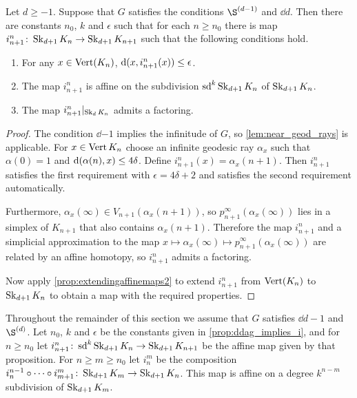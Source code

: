 \documentclass[a4paper]{article}
\begin{document}
\begin{proposition}\label{prop:ddag_implies_i}
  Let $d \geq -1$. Suppose that $G$ satisfies the conditions $\Sd{d-1}$ and
  $\dd{d}$. Then there are constants $n_0$, $k$ and $\epsilon$ such that for
  each $n\geq n_0$ there is map $i^n_{n+1}\colon\operatorname{Sk}_{d+1} K_n \to \operatorname{Sk}_{d+1}
  K_{n+1}$ such that the following conditions hold.
  \begin{enumerate}
    \item For any $x \in \operatorname{Vert}(K_n)$, $\operatorname{d}(x, i_{n+1}^n(x)) \leq
      \epsilon$.
    \item The map $i^n_{n+1}$ is affine on the subdivision $\operatorname{sd}^k\operatorname{Sk}_{d+1}
      K_n$ of $\operatorname{Sk}_{d+1}K_n$.
    \item The map $i^n_{n+1}\vert_{\operatorname{Sk}_d K_n}$ admits a factoring.
  \end{enumerate}
\end{proposition}

\begin{proof}
  The condition $\dd{-1}$ implies the infinitude of $G$, so
  \cref{lem:near_geod_rays} is applicable. For $x \in \operatorname{Vert}{K_n}$ choose an
  infinite geodesic ray $\alpha_x$ such that $\alpha(0) = 1$ and
  $\operatorname{d}(\alpha(n), x) \leq 4\delta$. Define $i^n_{n+1}(x) =
  \alpha_x(n+1)$. Then $i^n_{n+1}$ satisfies the first requirement with
  $\epsilon = 4\delta+2$ and satisfies the second requirement automatically.

  Furthermore, $\alpha_x(\infty) \in V_{n+1}(\alpha_x(n+1))$, so 
  $p^\infty_{n+1}(\alpha_x(\infty))$ lies in a simplex of $K_{n+1}$ that also 
  contains $\alpha_x(n+1)$.  Therefore the map $i^n_{n+1}$ and a simplicial 
  approximation to the map $x \mapsto \alpha_x(\infty) \mapsto p^\infty_{n+1} 
  (\alpha_x(\infty))$ are related by an affine homotopy, so $i^n_{n+1}$ admits a 
  factoring. 

  Now apply \cref{prop:extendingaffinemaps2} to extend $i^n_{n+1}$ from
  $\operatorname{Vert}(K_n)$ to $\operatorname{Sk}_{d+1} K_n$ to obtain a map with the required
  properties.
\end{proof}

Throughout the remainder of this section we assume that $G$ satisfies $\dd{d-1}$ 
and $\Sd{d}$. Let $n_0$, $k$ and $\epsilon$ be the constants given in 
\cref{prop:ddag_implies_i}, and for $n\geq n_0$ let $i^n_{n+1} 
\colon \operatorname{sd}^k\operatorname{Sk}_{d+1} K_n \to \operatorname{Sk}_{d+1} K_{n+1}$ be the affine map given by 
that proposition.  For $n \geq m \geq n_0$ let $i^m_n$ be the composition 
$i^{n-1}_n \circ \dotsb \circ i^m_{m+1} \colon \operatorname{Sk}_{d+1} K_m \to 
\operatorname{Sk}_{d+1} K_n$.  This map is affine on a degree $k^{n-m}$ subdivision of 
$\operatorname{Sk}_{d+1} K_m$.
\end{document}
